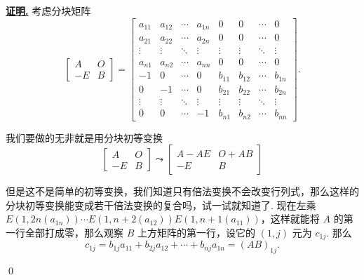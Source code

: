 \documentclass[10pt,openany]{article}
\theoremstyle{thmstyle} %
\theoremstyle{defstyle} %
\theoremstyle{prostyle} %
\theoremstyle{exastyle}
\theoremstyle{remstyle}
\renewenvironment{proof}[1][证明]{\par\underline{\textbf{#1.}} \;\fangsong}{\qed\par}
\begin{document}
\begin{proof}
	考虑分块矩阵
	\[  \begin{bmatrix}
		A & O \\
		-E & B
	\end{bmatrix}=\begin{bmatrix}
	a_{11} & a_{12} & \cdots & a_{1n} & 0 & 0 & \cdots & 0 \\
	a_{21} & a_{22} & \cdots & a_{2n} & 0 & 0 & \cdots & 0 \\
	\vdots & \vdots & \ddots & \vdots & \vdots & \vdots & \ddots & \vdots \\
	a_{n1} & a_{n2} & \cdots & a_{nn} & 0 & 0 & \cdots & 0 \\
	-1 & 0 & \cdots & 0  & b_{11} & b_{12} & \cdots & b_{1n} \\
    0 & -1 & \cdots & 0  & b_{21} & b_{22} & \cdots & b_{2n} \\
	\vdots & \vdots & \ddots & \vdots & \vdots & \vdots & \ddots & \vdots \\
	0 & 0 & \cdots & -1 & b_{n1} & b_{n2} & \cdots & b_{nn} 
	\end{bmatrix}. \]
	
	我们要做的无非就是用分块初等变换
	\[ \begin{bmatrix}
		A & O \\
		-E & B
	\end{bmatrix} \leadsto \begin{bmatrix}
	A-AE & O+AB \\
	-E & B
	\end{bmatrix} \]
	
	但是这不是简单的初等变换，我们知道只有倍法变换不会改变行列式，那么这样的分块初等变换能变成若干倍法变换的复合吗，试一试就知道了. 现在左乘 \( E(1,2n(a_{1n}))\cdots E(1,n+2(a_{12}))E(1,n+1(a_{11})) \)，这样就能将 \( A \) 的第一行全部打成零，那么观察 \( B \) 上方矩阵的第一行，设它的 \( (1,j) \) 元为 \( c_{1j} \). 那么
	\[ c_{1j}= b_{1j}a_{11}+b_{2j}a_{12}+\cdots+b_{nj}a_{1n}=(AB)_{1j}. \]
	

\end{proof}
\end{document}
